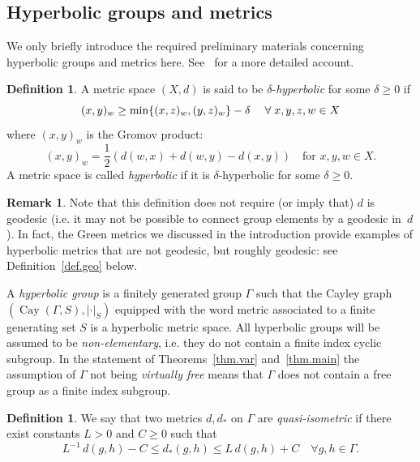 \documentclass[10pt]{amsart}
\theoremstyle{definition}\newtheorem{defi}[theo]{Definition}\newtheorem{rema}[theo]{Remark}\newtheorem{exam}[theo]{Example}\newtheorem{exem}[theo]{Example}\newtheorem{nota}[theo]{Notation}
\newcommand{\G}{\Gamma}
\renewcommand{\d}{\delta}
\DeclareMathOperator{\Cay}{Cay}
\let\originalleft\left
\let\originalright\right
\renewcommand{\left}{\mathopen{}\mathclose\bgroup\originalleft}
\renewcommand{\right}{\aftergroup\egroup\originalright}
\theoremstyle{plain}
\let\oldforall\forall
\renewcommand*{\forall}{\mathrel{\oldforall}}
\begin{document}
\subsection{Hyperbolic groups and metrics}

We only briefly introduce the required preliminary materials concerning hyperbolic groups and metrics here. See~\cite[Section~2]{cantrell.tanaka.1} for a more detailed account.

\begin{defi}
A metric space $(X, d)$ is said to be $\d$-\emph{hyperbolic} for some $\delta \ge 0$ if
\begin{equation*}
(x,y)_w \ge \min\left\{(x,z)_w, (y,z)_w\right\}-\d \quad %
\forall
x, y, z, w \in X
\end{equation*}
where $(x,y)_w$ is the Gromov product:
\[
(x,y)_w =\frac{1}{2}(d(w, x)+d(w, y)-d(x, y)) \quad \text{for } x, y, w \in X.
\]
A metric space is called \emph{hyperbolic} if it is $\d$-hyperbolic for some $\d \ge 0$.
\end{defi}
\begin{rema}
Note that this definition does not require (or imply that) $d$ is geodesic (i.e. it may not be possible to connect group elements by a geodesic in~$d$). In fact, the Green metrics we discussed in the introduction provide examples of hyperbolic metrics that are not geodesic, but roughly geodesic: see Definition~\ref{def.geo} below.
\end{rema}

A \emph{hyperbolic group} is a finitely generated group $\G$ such that the Cayley graph $(\Cay(\G,S), |\cdot|_S)$ equipped with the word metric associated to a finite generating set $S$ is a hyperbolic metric space. All hyperbolic groups will be assumed to be \emph{non-elementary}, i.e. they do not contain a finite index cyclic subgroup. In the statement of Theorems~\ref{thm.var} and~\ref{thm.main} the assumption of $\G$ not being \emph{virtually free} means that $\G$ does not contain a free group as a finite index subgroup.

\begin{defi}
We say that two metrics $d,d_\ast$ on $\G$ are \emph{quasi-isometric} if there exist constants $L > 0$ and $C \ge 0$ such that
\[
L^{-1} \, d(g, h)-C \le d_\ast(g, h) \le L \, d(g, h)+C \quad \forall g, h \in \G.
\]
\end{defi}
\end{document}

